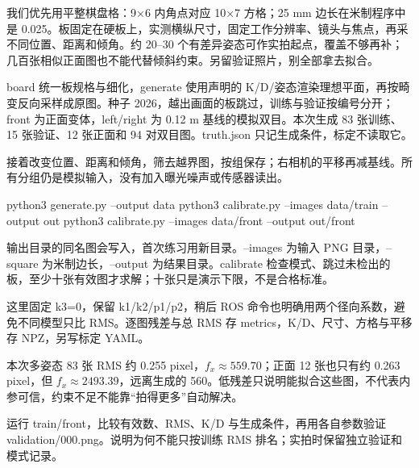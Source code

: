 我们优先用平整棋盘格：9×6 内角点对应 10×7 方格；25 mm 边长在米制程序中是 0.025。板固定在硬板上，实测横纵尺寸，固定工作分辨率、镜头与焦点，再采不同位置、距离和倾角。约 20–30 个有差异姿态可作实拍起点，覆盖不够再补；几百张相似正面图也不能代替倾斜约束。另留验证照片，别全部拿去拟合。
\begin{example}[生成可复现的模拟输入]
board 统一板规格与细化，generate 使用声明的 K/D/姿态渲染理想平面，再按畸变反向采样成原图。种子 2026，越出画面的板跳过，训练与验证按编号分开；front 为正面变体，left/right 为 0.12 m 基线的模拟双目。本次生成 83 张训练、15 张验证、12 张正面和 94 对双目图。truth.json 只记生成条件，标定不读取它。
\end{example}


接着改变位置、距离和倾角，筛去越界图，按组保存；右相机的平移再减基线。所有分组仍是模拟输入，没有加入曝光噪声或传感器读出。

\begin{tbash}
python3 generate.py --output data
python3 calibrate.py --images data/train --output out
python3 calibrate.py --images data/front --output out/front
\end{tbash}
输出目录的同名图会写入，首次练习用新目录。--images 为输入 PNG 目录，--square 为米制边长，--output 为结果目录。calibrate 检查模式、跳过未检出的板，至少十张有效图才求解；十张只是演示下限，不是合格标准。

这里固定 k3=0，保留 k1/k2/p1/p2，稍后 ROS 命令也明确用两个径向系数，避免不同模型只比 RMS。逐图残差与总 RMS 存 metrics，K/D、尺寸、方格与平移存 NPZ，另写标定 YAML。

本次多姿态 83 张 RMS 约 0.255 pixel，$f_x\approx559.70$；正面 12 张也只有约 0.263 pixel，但 $f_x\approx2493.39$，远离生成的 560。低残差只说明能拟合这些图，不代表内参可信，约束不足不能靠“拍得更多”自动解决。
\begin{exercise}\label{ex:v2-camera-calibrate}
运行 train/front，比较有效数、RMS、K/D 与生成条件，再用各自参数验证 validation/000.png。说明为何不能只按训练 RMS 排名；实拍时保留独立验证和模式记录。
\end{exercise}


